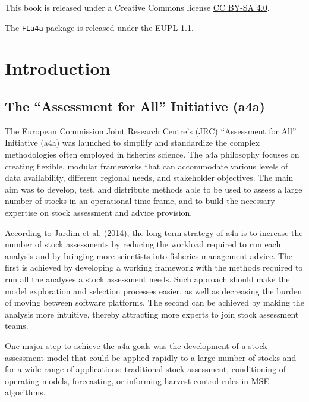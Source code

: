 \documentclass[
]{book}
\begin{document}
This book is released under a Creative Commons license \href{https://creativecommons.org/licenses/by-sa/4.0/}{CC BY-SA 4.0}.

The \texttt{FLa4a} package is released under the \href{https://joinup.ec.europa.eu/community/eupl/home}{EUPL 1.1}.

\hypertarget{introduction}{%
\chapter{Introduction}\label{introduction}}

\hypertarget{the-assessment-for-all-initiative-a4a}{%
\section{The ``Assessment for All'' Initiative (a4a)}\label{the-assessment-for-all-initiative-a4a}}

The European Commission Joint Research Centre's (JRC) ``Assessment for All'' Initiative (a4a) was launched to simplify and standardize the complex methodologies often employed in fisheries science. The a4a philosophy focuses on creating flexible, modular frameworks that can accommodate various levels of data availability, different regional needs, and stakeholder objectives. The main aim was to develop, test, and distribute methods able to be used to assess a large number of stocks in an operational time frame, and to build the necessary expertise on stock assessment and advice provision.

According to Jardim et al. (\protect\hyperlink{ref-EJ_etal_2014}{2014}), the long-term strategy of a4a is to increase the number of stock assessments by reducing the workload required to run each analysis and by bringing more scientists into fisheries management advice. The first is achieved by developing a working framework with the methods required to run all the analyses a stock assessment needs. Such approach should make the model exploration and selection processes easier, as well as decreasing the burden of moving between software platforms. The second can be achieved by making the analysis more intuitive, thereby attracting more experts to join stock assessment teams.

One major step to achieve the a4a goals was the development of a stock assessment model that could be applied rapidly to a large number of stocks and for a wide range of applications: traditional stock assessment, conditioning of operating models, forecasting, or informing harvest control rules in MSE algorithms.
\end{document}
